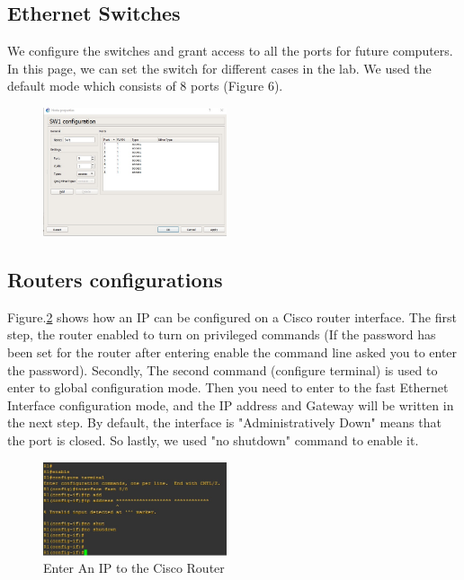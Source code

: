 \documentclass{article}
\begin{document}
\subsection{Ethernet Switches}
We configure the switches and grant access to all the ports for future computers.
In this page, we can set the switch for different cases in the lab. We used the
default mode which consists of 8 ports (Figure 6).

\begin{figure}[H]
	\begin{center}
		\includegraphics[width=0.48\textwidth]{Switchconf.jpg}
	\end{center}
	\caption{\small  \newline}
	\label{fig:Prd}
\end{figure}

\subsection{Routers configurations}

Figure.\ref{fig:Termconf} shows how an IP can be configured on a Cisco router interface. The first step, the router enabled to turn on privileged commands (If the password has been set for the router after entering enable the command line asked you to enter the password). Secondly, The second command (configure terminal) is used to enter to global configuration mode. Then you need to enter to the fast Ethernet Interface configuration mode, and the IP address and Gateway will be written in the next step. By default, the interface is "Administratively Down" means that the port is closed. So lastly, we used "no shutdown" command to enable it.

\begin{figure}[H]
	\begin{center}
		\includegraphics[width=0.48\textwidth]{Terminalconf.jpg}
	\end{center}
	\caption{\small Enter An IP to the Cisco Router \newline}
	\label{fig:Termconf}
\end{figure}
\end{document}
